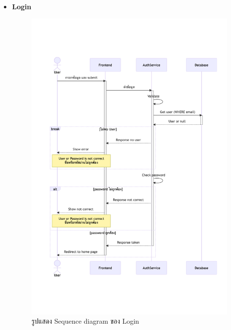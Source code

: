 \documentclass[12pt,oneside,openright,a4paper]{cpe-thai-project}
\begin{document}
\begin{itemize}
    \newpage
    \item \textbf{Login} \\
    \begin{figure}[!ht]\centering
        \includegraphics[width=13cm, trim={0 5cm 0 5cm},clip]{./assets/sequence-diagram/login.png}
        \caption{รูปแสดง Sequence diagram ของ Login}\label{fig:sqLogin}
    \end{figure}


\end{itemize}
\end{document}
